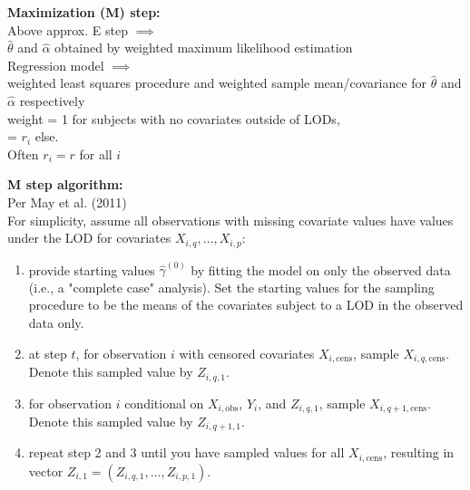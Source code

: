 \documentclass[xcolor=dvipsnames]{beamer}
\newcounter{tempcounter}
\begin{document}
\begin{frame}
\textbf{Maximization (M) step:}\\
Above approx. E step $\implies$\\
$\hat{\theta}$ and $\hat{\alpha}$ obtained by weighted maximum likelihood estimation\\
\vspace{0.5cm}
Regression model $\implies$\\
weighted least squares procedure and weighted sample mean/covariance for $\hat{\theta}$ and $\hat{\alpha}$ respectively\\
\vspace{0.5cm}
weight = 1 for subjects with no covariates outside of LODs,\\
= $r_i$ else.\\
\vspace{0.5cm}
Often $r_i=r$ for all $i$ 
\end{frame}

\begin{frame}
\textbf{M step algorithm:}\\
Per May et al. (2011)\\
For simplicity, assume all observations with missing covariate values have values under the LOD for covariates $X_{i,q}, \dots, X_{i,p}$:\\

\begin{enumerate}
  \item provide starting values $\hat{\gamma}^{(0)}$ by fitting the model on only the observed data (i.e., a "complete case" analysis).  Set the starting values for the sampling procedure to be the means of the covariates subject to a LOD in the observed data only.
  \item at step $t$, for observation $i$ with censored covariates $X_{i,\textrm{cens}}$, sample $X_{i,q,\textrm{cens}}$. Denote this sampled value by $Z_{i,q,1}$.
  \item for observation $i$ conditional on $X_{i,\textrm{obs}}$, $Y_i$, and $Z_{i,q,1}$, sample $X_{i,q+1,\textrm{cens}}$.  Denote this sampled value by $Z_{i,q+1,1}$.
  \item repeat step 2 and 3 until you have sampled values for all $X_{i,\textrm{cens}}$, resulting in vector $Z_{i,1}=(Z_{i,q,1},\dots,Z_{i,p,1})$.
  \setcounter{tempcounter}{\value{enumi}}
\end{enumerate}
\end{frame}
\end{document}
